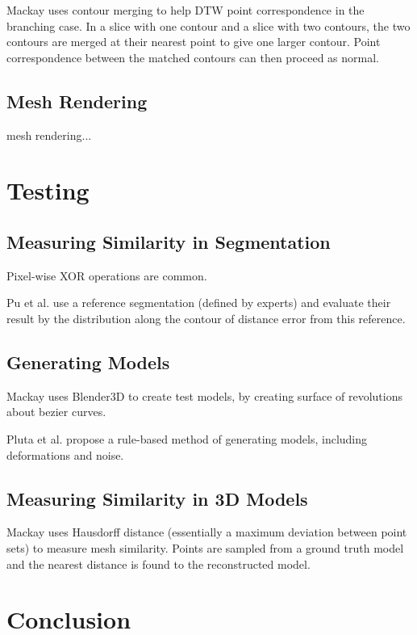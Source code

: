 \documentclass[acmsmall, 12pt]{acmart}
\begin{document}
Mackay \cite{mackay2019robust} uses contour merging to help DTW point correspondence in the branching case. In a slice with one contour and a slice with two contours, the two contours are merged at their nearest point to give one larger contour. Point correspondence between the matched contours can then proceed as normal.

\subsection{Mesh Rendering}
mesh rendering...

\section{Testing}

\subsection{Measuring Similarity in Segmentation}

Pixel-wise XOR operations are common.

Pu et al. \cite{pu2008adaptive} use a reference segmentation (defined by experts) and evaluate their result by the distribution along the contour of distance error from this reference.

\subsection{Generating Models}

Mackay \cite{mackay2019robust} uses Blender3D to create test models, by creating surface of revolutions about bezier curves. 

Pluta et al. \cite{pluta2012new} propose a rule-based method of generating models, including deformations and noise.

\subsection{Measuring Similarity in 3D Models}

Mackay \cite{mackay2019robust} uses Hausdorff distance (essentially a maximum deviation between point sets) to measure mesh similarity. Points are sampled from a ground truth model and the nearest distance is found to the reconstructed model.

\section{Conclusion}



\end{document}

